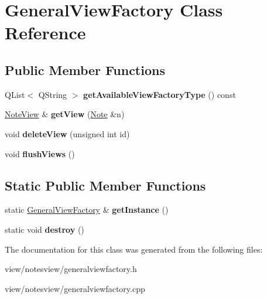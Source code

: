 \hypertarget{class_general_view_factory}{\section{General\-View\-Factory Class Reference}
\label{class_general_view_factory}
}
\subsection*{Public Member Functions}
\begin{DoxyCompactItemize}
\item 
\hypertarget{class_general_view_factory_a53f1389f4bc8dffaa4161cd8b7cc9e90}{Q\-List$<$ Q\-String $>$ {\bfseries get\-Available\-View\-Factory\-Type} () const }\label{class_general_view_factory_a53f1389f4bc8dffaa4161cd8b7cc9e90}

\item 
\hypertarget{class_general_view_factory_aca4aa8fa4ad777b90218e6ed7f4b77b8}{\hyperlink{class_note_view}{Note\-View} \& {\bfseries get\-View} (\hyperlink{class_note}{Note} \&n)}\label{class_general_view_factory_aca4aa8fa4ad777b90218e6ed7f4b77b8}

\item 
\hypertarget{class_general_view_factory_ae8452eab1d0b5e1732ce082da5864f43}{void {\bfseries delete\-View} (unsigned int id)}\label{class_general_view_factory_ae8452eab1d0b5e1732ce082da5864f43}

\item 
\hypertarget{class_general_view_factory_a2c9d86d8e3e5c6a970f669e5d49f2ae3}{void {\bfseries flush\-Views} ()}\label{class_general_view_factory_a2c9d86d8e3e5c6a970f669e5d49f2ae3}

\end{DoxyCompactItemize}
\subsection*{Static Public Member Functions}
\begin{DoxyCompactItemize}
\item 
\hypertarget{class_general_view_factory_addcc16b50fdded214ff068c5fa5d60a7}{static \hyperlink{class_general_view_factory}{General\-View\-Factory} \& {\bfseries get\-Instance} ()}\label{class_general_view_factory_addcc16b50fdded214ff068c5fa5d60a7}

\item 
\hypertarget{class_general_view_factory_a5189813d70c191954f69c6c7b075a947}{static void {\bfseries destroy} ()}\label{class_general_view_factory_a5189813d70c191954f69c6c7b075a947}

\end{DoxyCompactItemize}


The documentation for this class was generated from the following files\-:\begin{DoxyCompactItemize}
\item 
view/notesview/generalviewfactory.\-h\item 
view/notesview/generalviewfactory.\-cpp\end{DoxyCompactItemize}
